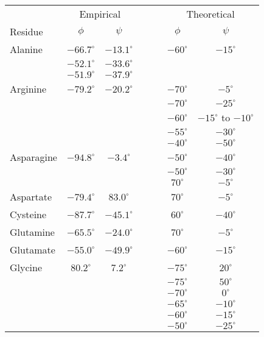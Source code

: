 \documentclass[12pt]{article}
\begin{document}
\begin{center}
\footnotesize
\begin{tabular}{lccccc}
&  \multicolumn{2}{c}{Empirical} & ~~~& \multicolumn{2}{c}{Theoretical}\\\cline{2-3}\cline{5-6}
Residue & $\phi$ & $\psi$ & & $\phi$ & $\psi$ \\
\hline Alanine   & $-66.7^{\circ}$ & $-13.1^{\circ}$ & & $-60^{\circ}$ & $-15^{\circ}$\\
                 & $-52.1^{\circ}$ & $-33.6^{\circ}$ & &\\
                 & $-51.9^{\circ}$ & $-37.9^{\circ}$ & &\\
Arginine        & $-79.2^{\circ}$ & $-20.2^{\circ}$ & & $-70^{\circ}$ & $-5^{\circ}$ \\
		 &	&	& & $-70^{\circ}$ & $-25^{\circ}$\\
		 &	&	& & $-60^{\circ}$ & $-15^{\circ}$ to $-10^{\circ}$\\
		 &	&	& & $-55^{\circ}$ & $-30^{\circ}$\\
                 &      &       & & $-40^{\circ}$ & $-50^{\circ}$\\      
Asparagine      & $-94.8^{\circ}$ & $-3.4^{\circ}$ & & $-50^{\circ}$ & $-40^{\circ}$ \\
                 &      &       & & $-50^{\circ}$ & $-30^{\circ}$\\
		 &      &       & & $70^{\circ}$ & $-5^{\circ}$\\
Aspartate    & $-79.4^{\circ}$ & $83.0^{\circ}$ & & $70^{\circ}$ & $-5^{\circ}$ \\
Cysteine        & $-87.7^{\circ}$ & $-45.1^{\circ}$ & & $60^{\circ}$ & $-40^{\circ}$ \\
Glutamine      & $-65.5^{\circ}$ & $-24.0^{\circ}$ & & $70^{\circ}$ & $-5^{\circ}$\\
Glutamate     & $-55.0^{\circ}$ & $-49.9^{\circ}$ & & $-60^{\circ}$ & $-15^{\circ}$\\
Glycine          & $80.2^{\circ}$ & $7.2^{\circ}$ & & $-75^{\circ}$ & $20^{\circ}$  \\
                 &      &       & & $-75^{\circ}$ & $50^{\circ}$\\
                 &      &       & & $-70^{\circ}$ & $0^{\circ}$\\
                 &      &       & & $-65^{\circ}$ & $-10^{\circ}$\\
                 &      &       & & $-60^{\circ}$ & $-15^{\circ}$\\
                 &      &       & & $-50^{\circ}$ & $-25^{\circ}$\\

\end{tabular}
\end{center}
\end{document}
